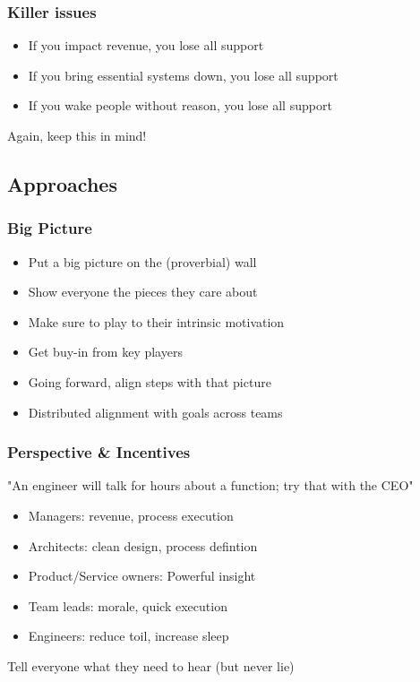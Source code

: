 \documentclass[t]{beamer}
\begin{document}
\begin{frame}
	\frametitle{Killer issues}
	\begin{itemize}
		\item If you impact revenue, you lose all support
		\item If you bring essential systems down, you lose all support
		\item If you wake people without reason, you lose all support
	\end{itemize}
	\vfill
	Again, keep this in mind!
	\vfill
\end{frame}


\subsection{Approaches}


\begin{frame}
	\frametitle{Big Picture}
	\begin{itemize}
		\item Put a big picture on the (proverbial) wall
		\item Show everyone the pieces they care about
		\item Make sure to play to their intrinsic motivation
		\item Get buy-in from key players
		\item Going forward, align steps with that picture
		\item Distributed alignment with goals across teams
	\end{itemize}
\end{frame}

\begin{frame}
	\frametitle{Perspective \& Incentives}
	"An engineer will talk for hours about a function; try that with the CEO"
	\vfill
	\begin{itemize}
		\item Managers: revenue, process execution
		\item Architects: clean design, process defintion
		\item Product/Service owners: Powerful insight
		\item Team leads: morale, quick execution
		\item Engineers: reduce toil, increase sleep
	\end{itemize}
	\vfill
	Tell everyone what they need to hear (but never lie)
	\vfill
\end{frame}
\end{document}
